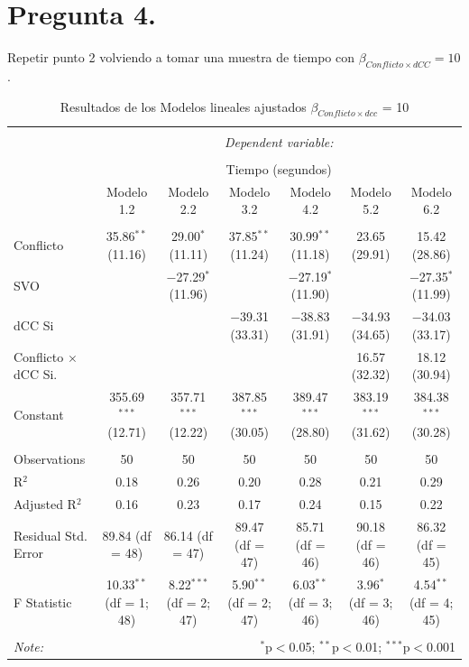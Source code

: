 \documentclass[
  spanish,
  10pt,
]{article}
\begin{document}
\section{Pregunta 4.}\label{pregunta-4.}

Repetir punto 2 volviendo a tomar una muestra de tiempo con
\(\beta_{Conflicto \times dCC} = 10\).

\begin{table}[H] \centering 
  \caption{Resultados de los Modelos lineales ajustados $\beta_{Conflicto \times dcc}$ = 10} 
  \label{} 
\scriptsize 
\begin{tabular}{@{\extracolsep{5pt}}lcccccc} 
\\[-1.8ex]\hline 
\hline \\[-1.8ex] 
 & \multicolumn{6}{c}{\textit{Dependent variable:}} \\ 
\cline{2-7} 
\\[-1.8ex] & \multicolumn{6}{c}{Tiempo (segundos)} \\ 
 & Modelo 1.2 & Modelo 2.2 & Modelo 3.2 & Modelo 4.2 & Modelo 5.2 & Modelo 6.2 \\ 
\hline \\[-1.8ex] 
 Conflicto & 35.86$^{**}$ (11.16) & 29.00$^{*}$ (11.11) & 37.85$^{**}$ (11.24) & 30.99$^{**}$ (11.18) & 23.65 (29.91) & 15.42 (28.86) \\ 
  SVO &  & $-$27.29$^{*}$ (11.96) &  & $-$27.19$^{*}$ (11.90) &  & $-$27.35$^{*}$ (11.99) \\ 
  dCC Si &  &  & $-$39.31 (33.31) & $-$38.83 (31.91) & $-$34.93 (34.65) & $-$34.03 (33.17) \\ 
  Conflicto $\times$ dCC Si. &  &  &  &  & 16.57 (32.32) & 18.12 (30.94) \\ 
  Constant & 355.69$^{***}$ (12.71) & 357.71$^{***}$ (12.22) & 387.85$^{***}$ (30.05) & 389.47$^{***}$ (28.80) & 383.19$^{***}$ (31.62) & 384.38$^{***}$ (30.28) \\ 
 \hline \\[-1.8ex] 
Observations & 50 & 50 & 50 & 50 & 50 & 50 \\ 
R$^{2}$ & 0.18 & 0.26 & 0.20 & 0.28 & 0.21 & 0.29 \\ 
Adjusted R$^{2}$ & 0.16 & 0.23 & 0.17 & 0.24 & 0.15 & 0.22 \\ 
Residual Std. Error & 89.84 (df = 48) & 86.14 (df = 47) & 89.47 (df = 47) & 85.71 (df = 46) & 90.18 (df = 46) & 86.32 (df = 45) \\ 
F Statistic & 10.33$^{**}$ (df = 1; 48) & 8.22$^{***}$ (df = 2; 47) & 5.90$^{**}$ (df = 2; 47) & 6.03$^{**}$ (df = 3; 46) & 3.96$^{*}$ (df = 3; 46) & 4.54$^{**}$ (df = 4; 45) \\ 
\hline 
\hline \\[-1.8ex] 
\textit{Note:}  & \multicolumn{6}{r}{$^{*}$p$<$0.05; $^{**}$p$<$0.01; $^{***}$p$<$0.001} \\ 
\end{tabular} 
\end{table}
\end{document}
